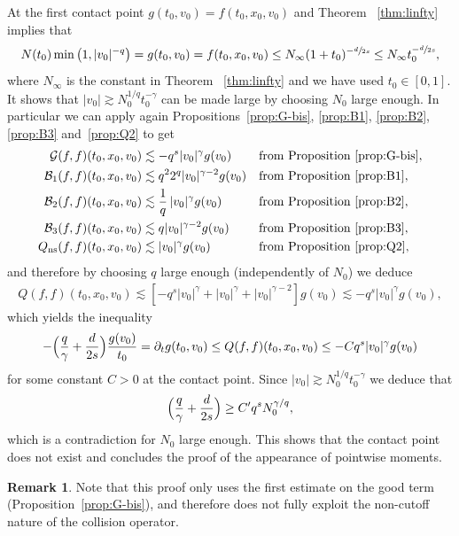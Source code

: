 \documentclass[JEP,XML,SOM,Unicode,NoFloatCountersInSection]{cedram}
\newcommand{\ns}{\mathrm{ns}}
\theoremstyle{plain}
\theoremstyle{definition}
\newtheorem{remark}[thm]{Remark}
\numberwithin{equation}{section}
\let\A N
\newcommand{\Ao}{N_0}
\newcommand{\Ai}{N_\infty}
\begin{document}
At the first contact point $g(t_0,v_0)=f(t_0,x_0,v_0)$ and Theorem
~\ref{thm:linfty} implies that
\[
\A(t_0) \min\left(1,|v_0|^{-q}\right) =g(t_0,v_0) =f(t_0,x_0,v_0)
\leq \Ai (1+t_0)^{-\sfrac{d}{2s}} \leq \Ai t_0^{-\sfrac{d}{2s}},
\]
where $N_\infty$ is the constant in Theorem ~\ref{thm:linfty} and we
have used $t_0 \in [0,1]$. It shows that
$|v_0| \gtrsim N_0^{1/q} t_0^{-\gamma}$ can be made large by choosing
$N_0$ large enough. In particular we can apply again
Propositions~\ref{prop:G-bis}, \ref{prop:B1}, \ref{prop:B2},
\ref{prop:B3} and~\ref{prop:Q2} to get
\begin{align*}
\mathcal G(f,f)(t_0,x_0,v_0) &\lesssim - q^s |v_0|^{\gamma} g(v_0) && \text{from Proposition } \ref{prop:G-bis},\\
\mathcal B_1 (f,f)(t_0,x_0,v_0) &\lesssim q^2 2^q |v_0|^{\gamma-2} g(v_0) && \text{from Proposition } \ref{prop:B1}, \\
\mathcal B_2 (f,f)(t_0,x_0,v_0) &\lesssim \frac 1 q\, |v_0|^\gamma g(v_0) && \text{from Proposition } \ref{prop:B2},\\
\mathcal B_3 (f,f)(t_0,x_0,v_0) &\lesssim q |v_0|^{\gamma-2} g(v_0) && \text{from Proposition } \ref{prop:B3}, \\
Q_{\ns}(f,f)(t_0,x_0,v_0) &\lesssim |v_0|^{\gamma} g(v_0) && \text{from Proposition } \ref{prop:Q2},
\end{align*}
and therefore by choosing $q$ large enough (independently of $\Ao$) we
deduce
\begin{align*}
Q(f,f)(t_0,x_0,v_0) \lesssim \left[ - q^s |v_0|^{\gamma} +
|v_0|^\gamma + |v_0|^{\gamma-2} \right] g(v_0) \lesssim - q^s
|v_0|^{\gamma} g(v_0),
\end{align*}
which yields the inequality
\[
-\Bigl(\frac{q}{\gamma} + \frac{d}{2s} \Bigr) \frac{g(v_0)}{t_0} =
\partial_t g(t_0,v_0) \le
Q(f,f)(t_0,x_0,v_0) \le - C q^s |v_0|^{\gamma} g(v_0)
\]
for some constant $C>0$ at the contact point. Since $|v_0| \gtrsim
N_0^{1/q} t_0^{-\gamma}$ we deduce that
\[
\Bigl(\frac{q}{\gamma} + \frac{d}{2s} \Bigr) \ge C' q^s
N_0^{\gamma/q},
\]
which is a contradiction for $N_0$ large enough. This shows that the
contact point does not exist and concludes the proof of the appearance
of pointwise moments.

\begin{remark}
Note that this proof only uses the first estimate on the good term
(Proposition~\ref{prop:G-bis}), and therefore does not fully exploit
the non-cutoff nature of the collision operator.
\end{remark}
\end{document}

